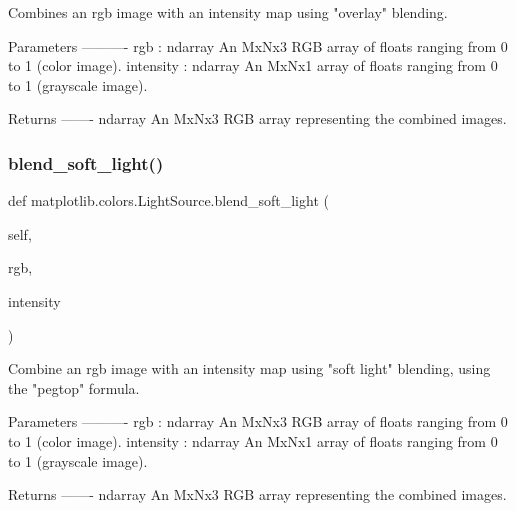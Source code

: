 \begin{DoxyVerb}Combines an rgb image with an intensity map using "overlay" blending.

Parameters
----------
rgb : ndarray
    An MxNx3 RGB array of floats ranging from 0 to 1 (color image).
intensity : ndarray
    An MxNx1 array of floats ranging from 0 to 1 (grayscale image).

Returns
-------
ndarray
    An MxNx3 RGB array representing the combined images.
\end{DoxyVerb}
 \mbox{\label{classmatplotlib_1_1colors_1_1LightSource_ac3fb1dce58f1e80de2f168bccaf36ccd}} 
\subsubsection{\texorpdfstring{blend\+\_\+soft\+\_\+light()}{blend\_soft\_light()}}
{\footnotesize\ttfamily def matplotlib.\+colors.\+Light\+Source.\+blend\+\_\+soft\+\_\+light (\begin{DoxyParamCaption}\item[{}]{self,  }\item[{}]{rgb,  }\item[{}]{intensity }\end{DoxyParamCaption})}

\begin{DoxyVerb}Combine an rgb image with an intensity map using "soft light" blending,
using the "pegtop" formula.

Parameters
----------
rgb : ndarray
    An MxNx3 RGB array of floats ranging from 0 to 1 (color image).
intensity : ndarray
    An MxNx1 array of floats ranging from 0 to 1 (grayscale image).

Returns
-------
ndarray
    An MxNx3 RGB array representing the combined images.
\end{DoxyVerb}
 \mbox{\label{classmatplotlib_1_1colors_1_1LightSource_a2ad08bc8b71ed120352b6afc1a3d6299}} 
